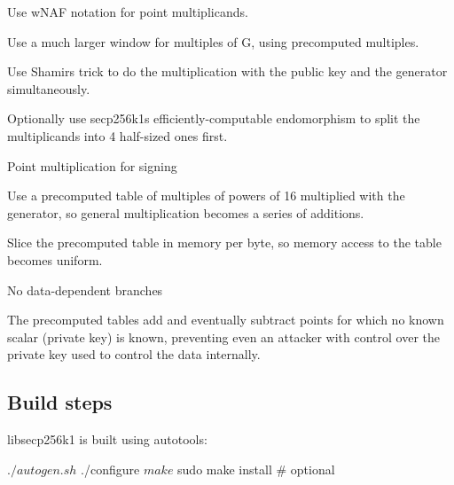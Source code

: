 \begin{DoxyItemize}
\begin{DoxyItemize}
\item Use w\+N\+AF notation for point multiplicands.
\item Use a much larger window for multiples of G, using precomputed multiples.
\item Use Shamir\textquotesingle{}s trick to do the multiplication with the public key and the generator simultaneously.
\item Optionally use secp256k1\textquotesingle{}s efficiently-\/computable endomorphism to split the multiplicands into 4 half-\/sized ones first.
\end{DoxyItemize}
\item Point multiplication for signing
\begin{DoxyItemize}
\item Use a precomputed table of multiples of powers of 16 multiplied with the generator, so general multiplication becomes a series of additions.
\item Slice the precomputed table in memory per byte, so memory access to the table becomes uniform.
\item No data-\/dependent branches
\item The precomputed tables add and eventually subtract points for which no known scalar (private key) is known, preventing even an attacker with control over the private key used to control the data internally.
\end{DoxyItemize}
\end{DoxyItemize}

\subsection*{Build steps }

libsecp256k1 is built using autotools\+: \begin{DoxyVerb}$ ./autogen.sh
$ ./configure
$ make
$ sudo make install  # optional\end{DoxyVerb}
 